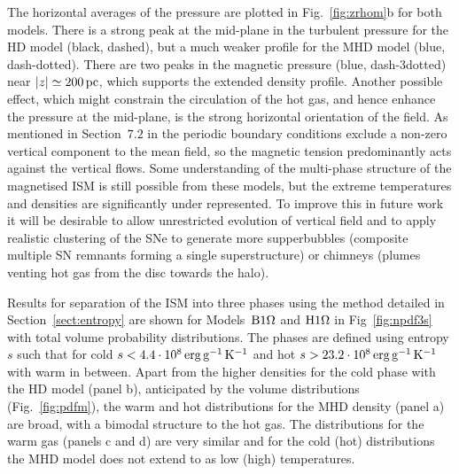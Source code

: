 \documentclass[useAMS,usenatbib]{mn2e}
\begin{document}
  The horizontal averages of the pressure are plotted in Fig.~\ref{fig:zrhom}b
  for both models. 
  There is a strong peak at the mid-plane in the turbulent pressure for the HD
  model (black, dashed), but a much weaker profile for the MHD model (blue,
  dash-dotted). 
  There are two peaks in the magnetic pressure (blue, dash-3dotted) near 
  $|z|\simeq200\,{\rm pc}$, which supports the extended density profile.
  Another possible effect, which might constrain the circulation of the hot
  gas, and hence enhance the pressure at the mid-plane, is the strong 
  horizontal orientation of the field.
  As mentioned in Section~$7.2$ in \citet{Gent12} the periodic boundary conditions
  exclude a non-zero vertical component to the mean field, so the magnetic
  tension predominantly acts against the vertical flows.
  Some understanding of the multi-phase structure of the magnetised ISM is
  still possible from these models, but the extreme temperatures and densities
  are significantly under represented.
  To improve this in future work it will be desirable to allow unrestricted 
  evolution of vertical field and to apply realistic clustering of the 
  SNe to generate more supperbubbles (composite multiple SN remnants forming a
  single superstructure) or chimneys (plumes venting hot gas from the disc 
  towards the halo).

  Results for separation of the ISM into three phases using the method 
  detailed in Section~\ref{sect:entropy} are shown for Models~${\mathrm{B}1\rm{\Omega} }$ and
  ${\mathrm{H}1\rm{\Omega}}$ in Fig~\ref{fig:npdf3s} with total volume probability distributions.
  The phases are defined using entropy $s$ such that for cold 
  $s<4.4\cdot10^{8}\,{\rm erg} \,{\rm g}^{-1}\,{\rm K}^{-1}$ and hot 
  $s>23.2\cdot10^{8}\,{\rm erg} \,{\rm g}^{-1}\,{\rm K}^{-1}$ with warm in between.
  Apart from the higher densities for the cold phase with the HD model (panel 
  b), 
  anticipated by the volume distributions (Fig.~\ref{fig:pdfm}), the warm and
  hot distributions for the MHD density (panel a) are broad, with a bimodal 
  structure to the hot gas. 
  The distributions for the warm gas (panels c and d) are very similar and for the
  cold (hot) distributions the MHD model does not extend to as low (high)
  temperatures. 
  
\end{document}
